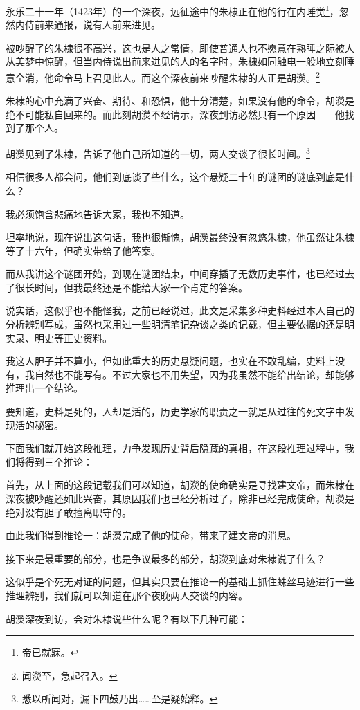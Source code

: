 \begin{multicols}{\theparacolNo}
永乐二十一年（1423年）的一个深夜，远征途中的朱棣正在他的行在内睡觉\footnote{帝已就寐。}，忽然内侍前来通报，说有人前来进见。

被吵醒了的朱棣很不高兴，这也是人之常情，即使普通人也不愿意在熟睡之际被人从美梦中惊醒，但当内侍说出前来进见的人的名字时，朱棣如同触电一般地立刻睡意全消，他命令马上召见此人。而这个深夜前来吵醒朱棣的人正是胡濙。\footnote{闻濙至，急起召入。}

朱棣的心中充满了兴奋、期待、和恐惧，他十分清楚，如果没有他的命令，胡濙是绝不可能私自回来的。而此刻胡濙不经请示，深夜到访必然只有一个原因——他找到了那个人。

胡濙见到了朱棣，告诉了他自己所知道的一切，两人交谈了很长时间。\footnote{悉以所闻对，漏下四鼓乃出……至是疑始释。}

相信很多人都会问，他们到底谈了些什么，这个悬疑二十年的谜团的谜底到底是什么？

我必须饱含悲痛地告诉大家，我也不知道。

坦率地说，现在说出这句话，我也很惭愧，胡濙最终没有忽悠朱棣，他虽然让朱棣等了十六年，但确实带给了他答案。

而从我讲这个谜团开始，到现在谜团结束，中间穿插了无数历史事件，也已经过去了很长时间，但我最终还是不能给大家一个肯定的答案。

说实话，这似乎也不能怪我，之前已经说过，此文是采集多种史料经过本人自己的分析辨别写成，虽然也采用过一些明清笔记杂谈之类的记载，但主要依据的还是明实录、明史等正史资料。

我这人胆子并不算小，但如此重大的历史悬疑问题，也实在不敢乱编，史料上没有，我自然也不能写有。不过大家也不用失望，因为我虽然不能给出结论，却能够推理出一个结论。

要知道，史料是死的，人却是活的，历史学家的职责之一就是从过往的死文字中发现活的秘密。

下面我们就开始这段推理，力争发现历史背后隐藏的真相，在这段推理过程中，我们将得到三个推论：

首先，从上面的这段记载我们可以知道，胡濙的使命确实是寻找建文帝，而朱棣在深夜被吵醒还如此兴奋，其原因我们也已经分析过了，除非已经完成使命，胡濙是绝对没有胆子敢擅离职守的。

由此我们得到推论一：胡濙完成了他的使命，带来了建文帝的消息。

接下来是最重要的部分，也是争议最多的部分，胡濙到底对朱棣说了什么？

这似乎是个死无对证的问题，但其实只要在推论一的基础上抓住蛛丝马迹进行一些推理辨别，我们就可以知道在那个夜晚两人交谈的内容。

胡濙深夜到访，会对朱棣说些什么呢？有以下几种可能：


\end{multicols}
